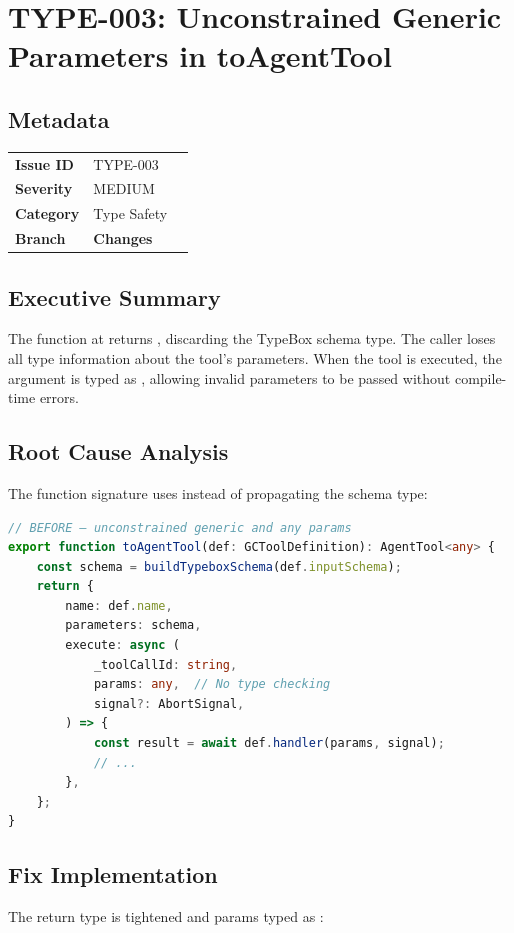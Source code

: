 \section{TYPE-003: Unconstrained Generic Parameters in toAgentTool}
\label{sec:type-003}
\subsection*{Metadata}
\begin{tabular}{ll}
\textbf{Issue ID} & TYPE-003 \\
\textbf{Severity} & MEDIUM \\
\textbf{Category} & Type Safety \\
\textbf{Branch} & 
\textbf{Changes} &  \\
\end{tabular}

\subsection*{Executive Summary}
The  function at  returns , discarding the TypeBox schema type. The caller loses all type information about the tool's parameters. When the tool is executed, the  argument is typed as , allowing invalid parameters to be passed without compile-time errors.

\subsection*{Root Cause Analysis}
The function signature uses  instead of propagating the schema type:

\begin{lstlisting}[language=TypeScript]
// BEFORE — unconstrained generic and any params
export function toAgentTool(def: GCToolDefinition): AgentTool<any> {
    const schema = buildTypeboxSchema(def.inputSchema);
    return {
        name: def.name,
        parameters: schema,
        execute: async (
            _toolCallId: string,
            params: any,  // No type checking
            signal?: AbortSignal,
        ) => {
            const result = await def.handler(params, signal);
            // ...
        },
    };
}
\end{lstlisting}

\subsection*{Fix Implementation}
The return type is tightened and params typed as :

